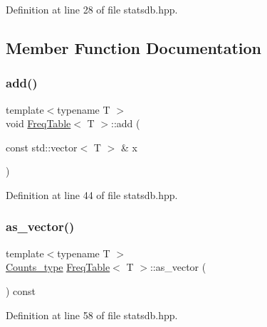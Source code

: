 Definition at line 28 of file statsdb.\+hpp.



\subsection{Member Function Documentation}
\mbox{\label{class_freq_table_a919e08556ba3aa9535a64827315bb89a}} 
\subsubsection{\texorpdfstring{add()}{add()}}
{\footnotesize\ttfamily template$<$typename T $>$ \\
void \hyperlink{class_freq_table}{Freq\+Table}$<$ T $>$\+::add (\begin{DoxyParamCaption}\item[{const std\+::vector$<$ T $>$ \&}]{x }\end{DoxyParamCaption})\hspace{0.3cm}{\ttfamily [inline]}}



Definition at line 44 of file statsdb.\+hpp.

\mbox{\label{class_freq_table_a1898e62605d8753e170189936d403e05}} 
\subsubsection{\texorpdfstring{as\+\_\+vector()}{as\_vector()}}
{\footnotesize\ttfamily template$<$typename T $>$ \\
\hyperlink{typedefs_8hpp_aee40fa17c1fddb63dd1f2b1470ade95b}{Counts\+\_\+type} \hyperlink{class_freq_table}{Freq\+Table}$<$ T $>$\+::as\+\_\+vector (\begin{DoxyParamCaption}{ }\end{DoxyParamCaption}) const\hspace{0.3cm}{\ttfamily [inline]}}



Definition at line 58 of file statsdb.\+hpp.

\mbox{\label{class_freq_table_a326660096e4309780aea8355d0f74ac7}} 
